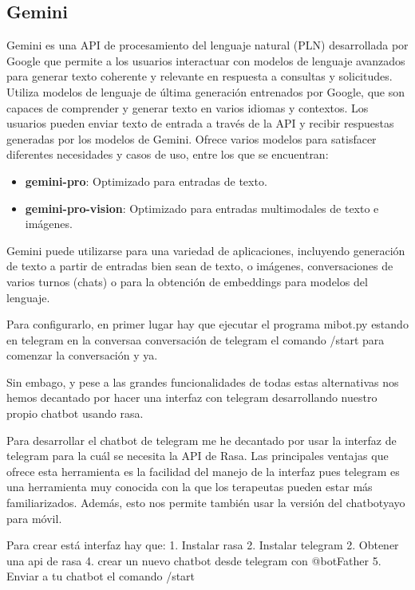 \subsection{Gemini}


Gemini es una API de procesamiento del lenguaje natural (PLN) desarrollada por Google que permite a los usuarios interactuar con modelos de lenguaje avanzados para generar texto coherente y relevante en respuesta a consultas y solicitudes. Utiliza modelos de lenguaje de última generación entrenados por Google, que son capaces de comprender y generar texto en varios idiomas y contextos. Los usuarios pueden enviar texto de entrada a través de la API y recibir respuestas generadas por los modelos de Gemini. Ofrece varios modelos para satisfacer diferentes necesidades y casos de uso, entre los que se encuentran:
\begin{itemize}[label=$\bullet$, leftmargin=*]
	\item \textbf{gemini-pro}: Optimizado para entradas de texto.
	\item \textbf{gemini-pro-vision}: Optimizado para entradas multimodales de texto e imágenes.
\end{itemize}

Gemini puede utilizarse para una variedad de aplicaciones, incluyendo generación de texto a partir de entradas bien sean de texto, o imágenes, conversaciones de varios turnos (chats) o para la obtención de embeddings para modelos del lenguaje. 

Para configurarlo, en primer lugar hay que ejecutar el programa mibot.py estando en telegram en la conversaa conversación de telegram el comando /start para comenzar la conversación y ya. 

Sin embago, y pese a las grandes funcionalidades de todas estas alternativas nos hemos decantado por hacer una interfaz con telegram desarrollando nuestro propio chatbot usando rasa. 

Para desarrollar el chatbot de telegram me he decantado por usar la interfaz de telegram para la cuál se necesita la API de Rasa. Las principales ventajas que ofrece esta herramienta es la facilidad del manejo de la interfaz pues telegram es una herramienta muy conocida con la que los terapeutas pueden estar más familiarizados. Además, esto nos permite también usar la versión del chatbotyayo para móvil. 

Para crear está interfaz hay que: 
1. Instalar rasa
2. Instalar telegram 
2. Obtener una api de rasa
4. crear un nuevo chatbot desde telegram con @botFather
5. Enviar a tu chatbot el comando /start

